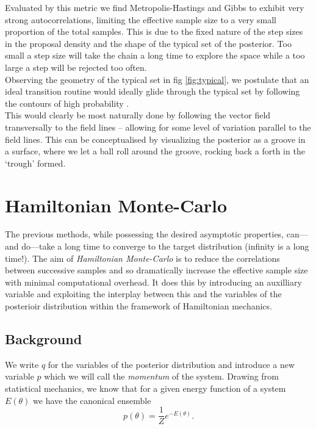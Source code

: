 \documentclass[11pt]{report}
\begin{document}
Evaluated by this metric we find Metropolis-Hastings and Gibbs to exhibit very strong autocorrelations, limiting the effective sample size to a very small proportion of the total samples. This is due to the fixed nature of the step sizes in the proposal density and the shape of the typical set of the posterior. Too small a step size will take the chain a long time to explore the space while a too large a step will be rejected too often. \\

Observing the geometry of the typical set in fig \ref{fig:typical}, we postulate that an ideal transition routine would ideally glide through the typical set by following the contours of high probability \citep{conceptual}. \\

This would clearly be most naturally done by following the vector field transversally to the field lines -- allowing for some level of variation parallel to the field lines. This can be conceptualised by visualizing the posterior as a groove in a surface, where we let a ball roll around the groove, rocking back a forth in the `trough' formed.

\section{Hamiltonian Monte-Carlo}

The previous methods, while possessing the desired asymptotic properties, can---and do---take a long time to converge to the target distribution (infinity is a long time!). The aim of \emph{Hamiltonian Monte-Carlo} is to reduce the correlations between successive samples and so dramatically increase the effective sample size with minimal computational overhead. It does this by introducing an auxilliary variable and exploiting the interplay between this and the variables of the posterioir distribution within the framework of Hamiltonian mechanics.

\subsection{Background}

We write $q$ for the variables of the posterior distribution and introduce a new variable $p$ which we will call the \emph{momentum} of the system. Drawing from statistical mechanics, we know that for a given energy function of a system $E(\theta)$ we have the canonical ensemble
\begin{equation}
  p(\theta) = \frac{1}{Z} e^{-E(\theta)}.
\end{equation}
\end{document}
